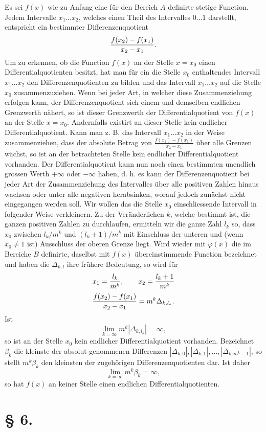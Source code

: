 Es sei $f(x)$ wie zu Anfang eine für den Bereich $A$ definirte stetige Function. Jedem Intervalle $x_1\ldots x_2$, welches einen Theil des Intervalles $0\ldots1$ darstellt, entspricht ein bestimmter Differenzenquotient
\[
 {f(x_2)-f(x_1)\over x_2-x_1}.
\]
Um zu erkennen, ob die Function $f(x)$ an der Stelle $x=x_0$ einen Differentialquotienten besitzt, hat man für ein die Stelle $x_0$ enthaltendes Intervall $x_1\ldots x_2$ den Differenzenquotienten zu bilden und das Intervall $x_1\ldots x_2$ auf die Stelle $x_0$ zusammenzuziehen. Wenn bei jeder Art, in welcher diese Zusammenziehung erfolgen kann, der Differenzenquotient sich einem und demselben endlichen Grenzwerth nähert, so ist dieser Grenzwerth der Differentialquotient von $f(x)$ an der Stelle $x=x_0$. Andernfalls existirt an dieser Stelle kein endlicher Differentialquotient. Kann man z. B. das Intervall $x_1\ldots x_2$ in der Weise zusammenziehen, dass der absolute Betrag von $\frac{f(x_2)-f(x_1)}{x_2-x_1}$ über alle Grenzen wächst, so ist an der betrachteten Stelle kein endlicher Differentialquotient vorhanden. Der Differentialquotient kann nun noch einen bestimmten unendlich grossen Werth $+\infty$ oder $-\infty$ haben, d. h. es kann der Differenzenquotient bei jeder Art der Zusammenziehung des Intervalles über alle positiven Zahlen hinaus wachsen oder unter alle negativen herabsinken, worauf jedoch zunächst nicht eingegangen werden soll. Wir wollen das die Stelle $x_0$ einschliessende Intervall in folgender Weise verkleinern. Zu der Veränderlichen $k$, welche bestimmt ist, die ganzen positiven Zahlen zu durchlaufen, ermitteln wir die ganze Zahl $l_k$ so, dass $x_0$ zwischen $l_k/m^k$ und $(l_k+1)/m^k$ mit Einschluss der unteren und (wenn $x_0\ne1$ ist) Ausschluss der oberen Grenze liegt. Wird wieder mit $\varphi(x)$ die im Bereiche $B$ definirte, daselbst mit $f(x)$ übereinstimmende Function bezeichnet und haben die $\Delta_{k,l}$ ihre frühere Bedeutung, so wird für
\[
 x_1={l_k\over m^k},\qquad x_2={l_k+1\over m^k}
\]
\[
 {f(x_2)-f(x_1)\over x_2-x_1}=m^k\Delta_{k,l_k}.
\]
Ist
\[
 \lim_{k=\infty}m^k|\Delta_{k,l_k}|=\infty,
\]
so ist an der Stelle $x_0$ kein endlicher Differentialquotient vorhanden. Bezeichnet $\beta_k$ die kleinste der absolut genommenen Differenzen $|\Delta_{k,0}|,|\Delta_{k,1}|,\ldots,|\Delta_{k,m^k-1}|$, so stellt $m^k\beta_k$ den kleinsten der zugehörigen Differenzenquotienten dar. Ist daher
\[
 \lim_{k=\infty}m^k\beta_k=\infty,
\]
so hat $f(x)$ an keiner Stelle einen endlichen Differentialquotienten.

\section*{§ 6.}

